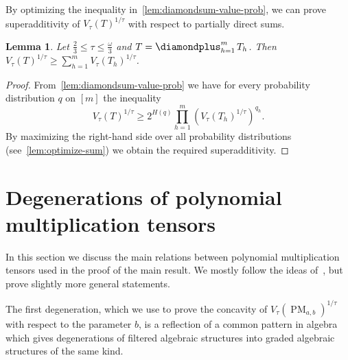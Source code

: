 \documentclass[11pt,letterpaper]{article}
\newtheorem{lemma}[theorem]{Lemma}\AddToHook{env/lemma/begin}{\crefalias{theorem}{lemma}}
\numberwithin{equation}{section}
\DeclareMathOperator*{\bigdiamondplus}{\scalerel*{\diamondplus}{\bigoplus}}
\DeclareMathOperator{\PM}{PM}
\begin{document}
By optimizing the inequality in~\cref{lem:diamondsum-value-prob}, we can prove superadditivity of $V_\tau(T)^{1/\tau}$
with respect to partially direct sums.

\begin{lemma}\label{lem:value-diamondsum}
    Let $\frac23\leq \tau \leq \frac{\omega}{3}$ and $T = \bigdiamondplus_{h = 1}^{m} T_h$.
    Then $V_\tau(T)^{1/\tau} \geq \sum_{h = 1}^{m} V_\tau(T_h)^{1/\tau}$.
\end{lemma}
\begin{proof}
  From~\cref{lem:diamondsum-value-prob} we have for every probability distribution $q$ on $[m]$ the inequality
  \[ V_\tau(T)^{1/\tau} \geq 2^{H(q)} \prod_{h = 1}^{m} \left(V_\tau(T_h)^{1/\tau}\right)^{q_h}. \]
  By maximizing the right-hand side over all probability distributions (see~\cref{lem:optimize-sum}) we obtain the required superadditivity.
\end{proof}

\section{Degenerations of polynomial multiplication tensors}
\label{sec:degens}

In this section we discuss the main relations between polynomial multiplication tensors used in the proof of the main result. We mostly follow the ideas of~\cite{chatgpt-paper}, but prove slightly more general statements.

The first degeneration, which we use to prove the concavity of $V_\tau(\PM_{a, b})^{1/\tau}$ with respect to the parameter $b$, is a reflection of a common pattern in algebra which gives degenerations of filtered algebraic structures into graded algebraic structures of the same kind.
\end{document}
